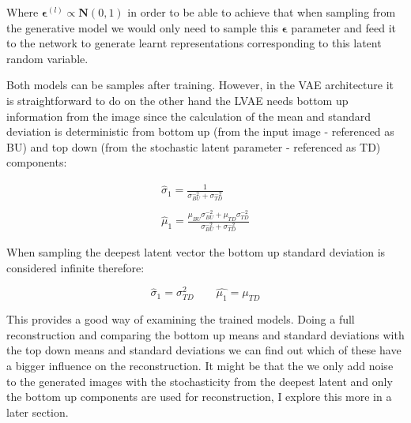 \documentclass[11pt, english]{article}
\begin{document}
\vspace{3mm}

\par Where $\boldsymbol{\bm{\epsilon}}^{(l)} \propto \boldsymbol{N}(0, 1)$ in order to be able to achieve that when sampling from the generative model we would only need to sample this $\bm{\epsilon}$ parameter and feed it to the network to generate learnt representations corresponding to this latent random variable.

\vspace{3mm}

\par Both models can be samples after training. However, in the VAE architecture it is straightforward to do on the other hand the LVAE needs bottom up information from the image since the calculation of the mean and standard deviation is deterministic from bottom up (from the input image - referenced as BU) and top down (from the stochastic latent parameter - referenced as TD) components:

\vspace{3mm}

\begin{gather*}
    \hat{\sigma}_{1} = \frac{1}{\sigma_{BU}^{-2} + \sigma_{TD}^{-2}} \\ \\
    \hat{\mu}_{1} = \frac{\mu_{BU}\sigma_{BU}^{-2} + \mu_{TD}\sigma_{TD}^{-2}}{\sigma_{BU}^{-2} + \sigma_{TD}^{-2}}
\end{gather*}

\vspace{3mm}

\par When sampling  the deepest latent vector the bottom up standard deviation is considered infinite therefore:

\vspace{3mm}

\begin{equation*}
    \hat{\sigma}_{1} = \sigma_{TD}^{2} \quad \quad \hat{\mu_{1}} = \mu_{TD}
\end{equation*}

\vspace{3mm}

\par This provides a good way of examining the trained models. Doing a full reconstruction and comparing the bottom up means and standard deviations with the top down means and standard deviations we can find out which of these have a bigger influence on the reconstruction. It might be that the we only add noise to the generated images with the stochasticity from the deepest latent and only the bottom up components are used for reconstruction, I explore this more in a later section.

\newpage
\printbibliography
\end{document}
